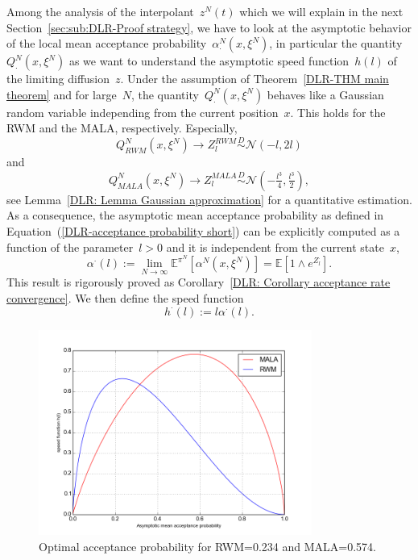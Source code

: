 Among the analysis of the interpolant~$z^N(t)$ which we will explain in the next Section~\ref{sec:sub:DLR-Proof strategy}, we have to look at the asymptotic behavior of the local mean acceptance probability~$\alpha^{N}_{\cdot} (x, \xi^{N})$, in particular the quantity~$Q^{N}_{\cdot}(x, \xi^{N})$ as we want to understand the asymptotic speed function~$h(l)$ of the limiting diffusion~$z$. Under the assumption of Theorem~\ref{DLR-THM main theorem} and for large~$N$, the quantity~$Q^{N}_{\cdot}(x, \xi^{N})$ behaves like a Gaussian random variable independing from the current position~$x$. This holds for the RWM and the MALA, respectively. Especially, 
\begin{equation}
\label{DLR-Gaussian RWM short}
 Q^{N}_{RWM}(x, \xi^{N}) \to Z_l^{RWM} \stackrel{D}{\sim} \mathcal{N}(-l, 2l)
\end{equation}
and
\begin{equation}
\label{DLR-Gaussian MALA short}
 Q^{N}_{MALA}(x, \xi^{N}) \to Z_l^{MALA} \stackrel{D}{\sim} \mathcal{N}(-\tfrac{l^3}{4}, \tfrac{l^3}{2}),
\end{equation}
see Lemma~\ref{DLR: Lemma Gaussian approximation} for a quantitative estimation.  As a consequence, the asymptotic mean acceptance probability as defined in Equation~(\ref{DLR-acceptance probability short}) can be explicitly  computed  as a function of the parameter~$l>0$ and it is independent from the current state~$x$,
\begin{equation}
\label{DLR-asymptotic mean acceptance probability}
 \alpha^{\cdot}(l) := \lim_{N \to \infty}  \mathbb{E}^{\pi^N} \left[ \alpha^N(x, \xi^N) \right] = \mathbb{E} \left[ 1 \wedge e^{Z_l^{\cdot}} \right].
\end{equation}
This result is rigorously proved as Corollary~\ref{DLR: Corollary acceptance rate convergence}. We then define the speed function
\begin{equation}
 h^{\cdot}(l) := l \alpha^{\cdot}(l).
\end{equation}

\begin{figure}[htb]
 \begin{center} 
  \includegraphics[width=0.8\textwidth]{speedmeasures}
 \end{center}
  \caption{Optimal acceptance probability for RWM=0.234 and MALA=0.574.}
  \label{fig:optimal acceptance probability}
\end{figure}

